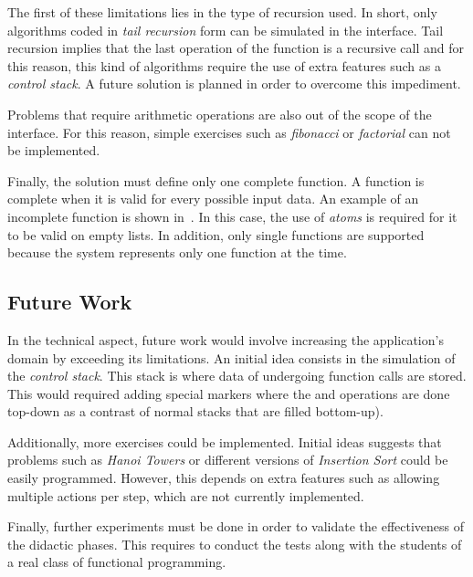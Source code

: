 The first of these limitations lies in the type of recursion used.
In short, only algorithms coded in \emph{tail recursion} form can be
simulated in the interface. Tail recursion implies that the last
operation of the function is a recursive call and for this reason,
this kind of algorithms require the use of extra features such as a
\emph{control stack}. A future solution is planned in order to
overcome this impediment.

Problems that require arithmetic operations are also out of the scope
of the interface. For this reason, simple exercises such as
\emph{fibonacci} or \emph{factorial} can not be implemented.

Finally, the solution must define only one complete function. A
function is complete when it is valid for every possible input data.
An example of an incomplete function is shown
in~. In this case, the use of \erlang
\emph{atoms} is required for it to be valid on empty lists. In
addition, only single functions are supported because the system
represents only one function at the time.

\subsection{Future Work}

In the technical aspect, future work would involve increasing the
application's domain by exceeding its limitations. An initial idea
consists in the simulation of the \emph{control stack}. This stack
is where data of undergoing function calls are stored. This would
required adding special markers where the \push and \pop operations
are done top\hyp{}down as a contrast of normal stacks that are filled
bottom\hyp{}up).

Additionally, more exercises could be implemented. Initial ideas
suggests that problems such as \emph{Hanoi Towers} or different
versions of \emph{Insertion Sort} could be easily programmed. However,
this depends on extra features such as allowing multiple actions per
step, which are not currently implemented.

Finally, further experiments must be done in order to validate the
effectiveness of the didactic phases. This requires to conduct the
tests along with the students of a real class of functional
programming.
